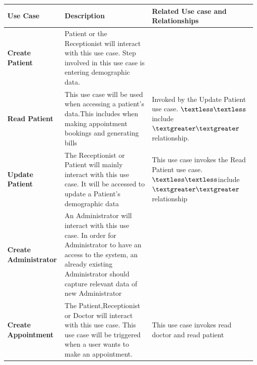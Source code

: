 \documentclass[11 pt]{article}
\begin{document}
\begin{tabular}{|p{3cm}|p{4.5cm}|p{4.5cm}|}
\hline
\textbf{Use Case} & \textbf{Description} & \textbf{Related Use case and Relationships} \\
\hline
\textbf{Create Patient} & Patient or the Receptionist will interact with this use case. Step involved in this use case is entering demographic data.  &\\
\hline
\textbf{Read Patient}& This use case will be used when accessing a patient's data.This includes when making appointment bookings and generating bills & Invoked by the Update Patient use case. $\textless\textless$include$\textgreater\textgreater$ relationship.\\
\hline
\textbf{Update Patient}& The Receptionist or Patient will mainly interact with this use case. It will be accessed to update a Patient's demographic data & This use case invokes the Read Patient use case. $\textless\textless$include$\textgreater\textgreater$ relationship\\
\hline
\textbf{Create Administrator}& An Administrator will interact with this use case. In order for Administrator to have an access to the system, an already existing Administrator should capture relevant data of new Administrator &\\
\hline
\textbf{Create Appointment}& The Patient,Receptionist or Doctor will interact with this use case. This use case will be triggered when a user wants to make an appointment. & This use case invokes read doctor and read patient\\

\hline

\end{tabular}
\end{document}
